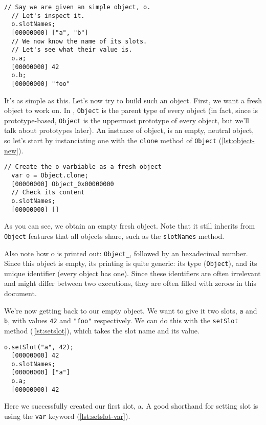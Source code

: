 \documentclass[openright,twoside,12pt]{report}
\newcommand{\lst}[1]{\autoref{lst:#1}}
\begin{document}
\begin{lstlisting}[caption=Inspecting an \urbi
  object,label=lst:object-slots]
  // Say we are given an simple object, o.
  // Let's inspect it.
  o.slotNames;
  [00000000] ["a", "b"]
  // We now know the name of its slots.
  // Let's see what their value is.
  o.a;
  [00000000] 42
  o.b;
  [00000000] "foo"
\end{lstlisting}

It's as simple as this. Let's now try to build such an object. First,
we want a fresh object to work on. In \urbi, \texttt{Object} is the
parent type of every object (in fact, since \urbi is prototype-based,
\texttt{Object} is the uppermost prototype of every object, but we'll
talk about prototypes later). An instance of object, is an empty,
neutral object, so let's start by instanciating one with the
\texttt{clone} method of \texttt{Object} (\lst{object-new}).

\begin{lstlisting}[caption=Instanciating a new object,
  label=lst:object-new]
  // Create the o varbiable as a fresh object
  var o = Object.clone;
  [00000000] Object_0x00000000
  // Check its content
  o.slotNames;
  [00000000] []
\end{lstlisting}

As you can see, we obtain an empty fresh object. Note that it still
inherits from \texttt{Object} features that all objects share, such as
the \texttt{slotNames} method.

Also note how o is printed out: \texttt{Object\_}, followed by an
hexadecimal number. Since this object is empty, its printing is quite
generic: its type (\texttt{Object}), and its unique identifier (every
\urbi object has one). Since these identifiers are often irrelevant
and might differ between two executions, they are often filled with
zeroes in this document.

We're now getting back to our empty object. We want to give it two
slots, \texttt{a} and \texttt{b}, with values \lstinline|42| and
\lstinline|"foo"| respectively. We can do this with the
\texttt{setSlot} method (\lst{setslot}), which takes the slot name and
its value.

\begin{lstlisting}[caption=Defining slots, label=lst:setslot]
  o.setSlot("a", 42);
  [00000000] 42
  o.slotNames;
  [00000000] ["a"]
  o.a;
  [00000000] 42
\end{lstlisting}

Here we successfully created our first slot, a. A good shorthand for
setting slot is using the \texttt{var} keyword (\lst{setslot-var}).
\end{document}
